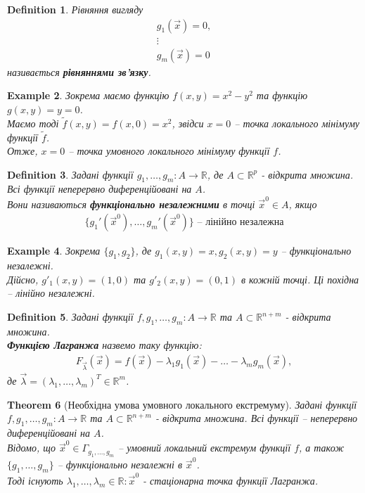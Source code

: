 \documentclass[a4paper, 10pt]{article}
\theoremstyle{theoremdd}
\newtheorem{theorem}{Theorem}[subsection]
\theoremstyle{theoremdd}
\theoremstyle{theoremdd}
\newtheorem{definition}[theorem]{Definition}
\theoremstyle{theoremdd}
\theoremstyle{theoremdd}
\newtheorem{example}[theorem]{Example}
\theoremstyle{theoremdd}
\theoremstyle{theoremdd}
\theoremstyle{theoremdd}
\theoremstyle{theoremdd}
\begin{document}
\begin{definition}
Рівняння вигляду
\begin{align*}
g_1(\vec{x}) = 0,\\
\vdots \\
g_m(\vec{x}) = 0
\end{align*}
називається \textbf{рівняннями зв'язку}.
\end{definition}

\begin{example}
Зокрема маємо функцію $f(x,y) = x^2-y^2$ та функцію $g(x,y) = y = 0$.\\
Маємо тоді $\tilde{f}(x,y) = f(x,0) = x^2$, звідси $x = 0$ -- точка локального мінімуму функції $\tilde{f}$.\\
Отже, $x = 0$ -- точка умовного локального мінімуму функції $f$.
\end{example}

\begin{definition}
Задані функції $g_1,\dots,g_m\colon A \to \mathbb{R}$, де $A \subset \mathbb{R}^p$ - відкрита множина. Всі функції неперервно диференційовані на $A$.\\
Вони називаються \textbf{функціонально незалежними} в точці $\vec{x}^0 \in A$, якщо
\begin{align*}
\{g_1'(\vec{x}^0),\dots,g_m'(\vec{x}^0)\} \text{ -- лінійно незалежна}
\end{align*}
\end{definition}

\begin{example}
Зокрема $\{g_1,g_2\}$, де $g_1(x,y) = x, g_2(x,y) = y$ -- функціонально незалежні.\\
Дійсно, $g'_1(x,y) = (1,0)$ та $g'_2(x,y) = (0,1)$ в кожній точці. Ці похідна -- лінійно незалежні.
\end{example}

\begin{definition}
Задані функції $f,g_1,\dots,g_m\colon A \to \mathbb{R}$ та $A \subset \mathbb{R}^{n+m}$ - відкрита множина.\\
\textbf{Функцією Лагранжа} назвемо таку функцію:
\begin{align*}
F_{\vec{\lambda}}(\vec{x}) = f(\vec{x}) - \lambda_1g_1(\vec{x}) - \dots - \lambda_m g_m(\vec{x}),
\end{align*}
де $\vec{\lambda} = (\lambda_1,\dots,\lambda_m)^T \in \mathbb{R}^m$.
\end{definition}

\begin{theorem}[Необхідна умова умовного локального екстремуму]
Задані функції $f,g_1,\dots,g_m\colon A \to \mathbb{R}$ та $A \subset \mathbb{R}^{n+m}$ - відкрита множина. Всі функції -- неперервно диференційовані на $A$.\\
Відомо, що $\vec{x}^0 \in \Gamma_{g_1,\dots,g_m}$ -- умовний локальний екстремум функції $f$, а також $\{g_1,\dots,g_m\}$ -- функціонально незалежні в $\vec{x}^0$.\\
Тоді існують $\lambda_1,\dots,\lambda_m \in \mathbb{R}: \vec{x}^0$ - стаціонарна точка функції Лагранжа.
\end{theorem}
\end{document}
